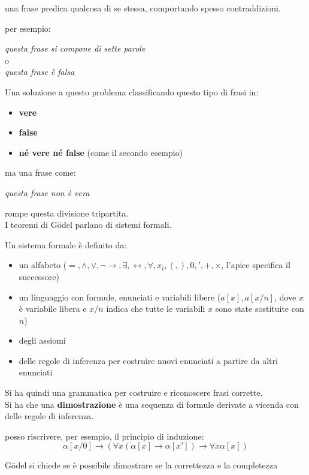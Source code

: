 \documentclass[a4paper,12pt, oneside]{book}
\begin{document}
una frase predica qualcosa di se stessa, comportando spesso contraddizioni.
\begin{esempio}
  per esempio:
  \begin{center}
    \textit{questa frase si compone di sette parole}
    \\o\\
    \textit{questa frase è falsa}
  \end{center}
\end{esempio}
Una soluzione a questo problema classificando questo tipo di frasi in:
\begin{itemize}
  \item \textbf{vere}
  \item \textbf{false}
  \item \textbf{né vere né false} (come il secondo esempio)
\end{itemize}
ma una frase come:
\begin{center}
  \textit{questa frase non è vera}
\end{center}
rompe questa divisione tripartita. \\
I teoremi di G\"{o}del parlano di sistemi formali.
\begin{definizione}
  Un sistema formale è definito da:
  \begin{itemize}
    \item un alfabeto ($=,\land,\lor, \neg \to, \exists, \leftrightarrow,
    \forall, x_i, (,),0,',+,\times$, l'apice specifica il successore)
    \item un linguaggio con formule, enunciati e variabili libere ($a[x],
    a[x/n]$, dove $x$ è variabile libera e $x/n$ indica che tutte le variabili
    $x$ sono state sostituite con $n$) 
    \item degli assiomi
    \item delle regole di inferenza per costruire nuovi enunciati a partire da
    altri enunciati
  \end{itemize}
  Si ha quindi una grammatica per costruire e riconoscere frasi corrette.\\
  Si ha che una \textbf{dimostrazione} è una sequenza di formule derivate a
  vicenda con delle regole di inferenza.
  \begin{esempio}
    posso riscrivere, per esempio, il principio di induzione:
    \[\alpha[x/0]\to(\forall x(\alpha[x]\to \alpha[x'])\to \forall x\alpha[x])\]
  \end{esempio}  
\end{definizione}
\newpage
G\"{o}del si chiede se è possibile dimostrare se la correttezza e la completezza
\end{document}
